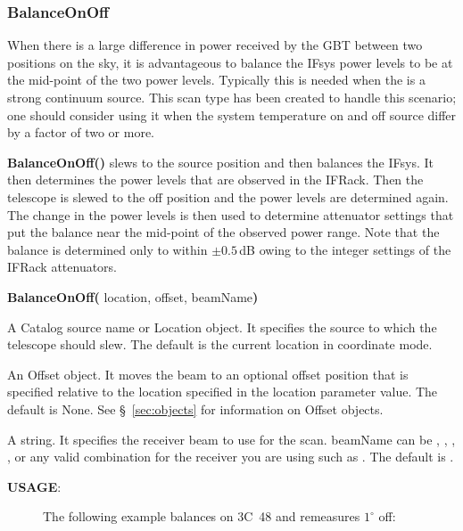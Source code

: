 \subsubsection{BalanceOnOff}\label{sec:balanceonoff}

When there is a large difference in power received by the \gls{GBT} between 
two positions on the sky, it is advantageous to balance the \gls{IFsys}
power levels to be at the mid-point of the two power levels. Typically 
this is needed when the  is a strong continuum source. 
This scan type has been created to handle this scenario; one should
consider using it when the system temperature on and off source
differ by a factor of two or more.

{\bfseries{\textcolor{pythonKeywords}{BalanceOnOff}}()} slews to the source
position and then balances the \gls{IFsys}. It then determines the
power levels that are observed in the \gls{IFRack}. Then the telescope is
slewed to the off position and the power levels are determined again. The
change in the power levels is then used to determine attenuator settings
that put the balance near the mid-point of the observed power range. Note
that the balance is determined only to within $\pm 0.5$\,dB owing to the
integer settings of the \gls{IFRack} attenuators.

\begin{description}[itemsep=1pt]
\item[{\bf SYNTAX}:] {\bfseries{\textcolor{pythonKeywords}{BalanceOnOff}}(}
location, offset, beamName{\bf)}
\item[location] A Catalog source name or Location object. It specifies the 
source to which the telescope should slew. The default is the current
location in  coordinate mode.
\item[offset] An Offset object. It moves the beam to an optional offset 
position that is specified relative to the location specified in the 
location parameter value. The default is None.  See \S~\ref{sec:objects} for
information on Offset objects.
\item[beamName] A string. It specifies the receiver beam to use for the scan. 
beamName can be , , , ,  or any valid combination
for the receiver you are using such as . The default is .
\end{description}

\begin{description}
\item[{\bf USAGE}:] The following example balances on 3C~48 and remeasures $1^\circ$ off:
\end{description}
\vspace{-0.25cm}

